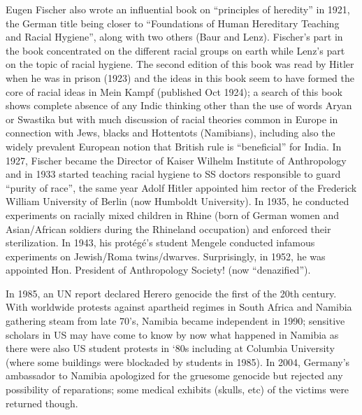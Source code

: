 Eugen Fischer also wrote an influential book on “principles of heredity” in 1921, the German title being closer to “Foundations of Human Hereditary Teaching and Racial Hygiene”, along with two others (Baur and Lenz).  Fischer’s part in the book concentrated on the different racial groups on earth while Lenz’s part on the topic of racial hygiene. The second edition of this book was read by Hitler when he was in prison (1923) and the ideas in this book seem to have formed the core of racial ideas in Mein Kampf (published Oct 1924); a search of this book shows complete absence of any Indic thinking other than the use of words Aryan or Swastika but with much  discussion of  racial theories common in Europe in connection with Jews, blacks and Hottentots (Namibians), including also the widely prevalent European notion that British rule is “beneficial” for India. In 1927, Fischer became the Director of Kaiser Wilhelm Institute of Anthropology and in 1933 started teaching racial hygiene to SS doctors responsible to guard “purity of race”, the same year Adolf Hitler appointed him rector of the Frederick William University of Berlin (now Humboldt University). In 1935, he conducted experiments on racially mixed children in Rhine (born of German women and Asian/African soldiers during the Rhineland occupation) and enforced their sterilization. In 1943, his protégé’s student Mengele conducted infamous experiments on Jewish/Roma twins/dwarves. Surprisingly, in 1952, he was appointed Hon. President of Anthropology Society! (now “denazified”).

In 1985, an UN report declared Herero genocide the first of the 20th century. With worldwide protests against apartheid regimes in South Africa and Namibia gathering steam from late 70’s, Namibia became independent in 1990; sensitive scholars in US may have come to know by now what happened in Namibia as there were also US student protests in ‘80s including at Columbia University (where some buildings were blockaded by students in 1985). In 2004, Germany’s ambassador to Namibia apologized for the gruesome genocide but rejected any possibility of reparations; some medical exhibits (skulls, etc) of the victims were returned though.

